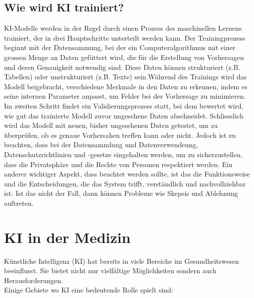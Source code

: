 \documentclass{article}
\begin{document}
\subsection {Wie wird KI trainiert?}

KI-Modelle werden in der Regel durch einen Prozess des maschinellen Lernens trainiert, 
der in drei Hauptschritte unterteilt werden kann. Der Trainingprozess beginnt mit der Datensammung, 
bei der ein Computeralgorithmus mit einer grossen Menge an Daten gefüttert wird, die für die Erstellung 
von Vorhersagen und deren Genauigkeit notwendig sind. Diese Daten können strukturiert (z.B. Tabellen) oder 
unstrukturiert (z.B. Texte) sein.Während des Trainings wird das Modell beigebracht, verschiedene Merkmale 
in den Daten zu erkennen, indem es seine internen Parameter anpasst, um Fehler bei der Vorhersage 
zu minimieren. \\ Im zweiten Schritt findet ein Validierungsprozess statt, bei dem bewertet wird, wie gut 
das trainierte Modell zuvor ungesehene Daten abschneidet. Schliesslich wird das Modell mit neuen, bisher 
ungesehenen Daten getestet, um zu überprüfen, ob es genaue Vorhersahen treffen kann oder nicht. 
\newline
\citep{clickworker}
\newline
Jedoch ist zu beachten, dass bei der Datensammlung und Datenverwendeung, Datenschutzrichtlinien und -gesetze 
eingehalten werden, um zu sicherzustellen, dass die Privatsphäre und die Rechte von Personen respektiert 
werden. Ein anderer wichtiger Aspekt, dass beachtet werden sollte, ist das die Funktionsweise und die 
Entscheidungen, die das System trifft, verständlich und nachvollziehbar ist. Ist das nicht der Fall, 
dann können Probleme wie Skepsis und Ablehnung auftreten. 


\section{KI in der Medizin}

Künstliche Intelligenz (KI) hat bereits in viele Bereiche im Gesundheitswesen beeinflusst. Sie bietet nicht nur 
vielfältige Möglichkeiten sondern auch Herausforderungen.\\ Einige Gebiete wo KI eine bedeutende Rolle spielt sind:
\end{document}
